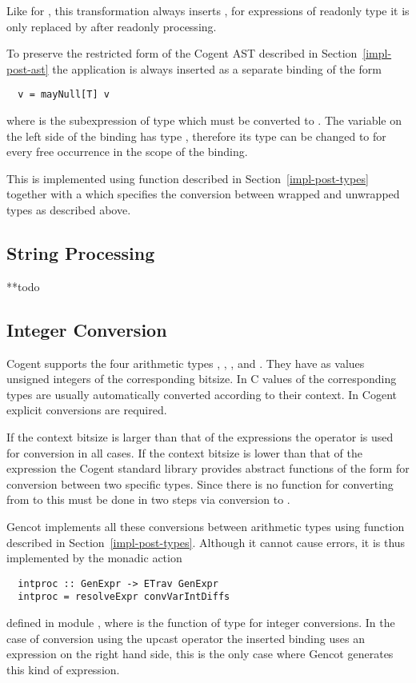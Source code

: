 Like for , this transformation always inserts , for expressions of readonly type it is only replaced by
 after readonly processing.

To preserve the restricted form of the Cogent AST described in Section~\ref{impl-post-ast} the  application is always
inserted as a separate binding of the form
\begin{verbatim}
  v = mayNull[T] v
\end{verbatim}
where  is the subexpression of type  which must be converted to . The variable  on the left side
of the binding has type , therefore its type can be changed to  for every free occurrence in the scope
of the binding.

This is implemented using function  described in Section~\ref{impl-post-types} together with a 
which specifies the conversion between  wrapped and unwrapped types as described above.

\subsection{String Processing}
\label{impl-post-string}

**todo 

\subsection{Integer Conversion}
\label{impl-post-int}

Cogent supports the four arithmetic types , , , and . They have as values unsigned
integers of the corresponding bitsize. In C values of the corresponding types are usually automatically converted according
to their context. In Cogent explicit conversions are required.

If the context bitsize is larger than that of the expressions the  operator is used for conversion in all cases.
If the context bitsize is lower than that of the expression the Cogent standard library provides abstract functions of the
form  for conversion between two specific types. Since there is no function for converting from 
to  this must be done in two steps via conversion to .

Gencot implements all these conversions between arithmetic types using function  described in
Section~\ref{impl-post-types}. Although it cannot cause errors, it is thus implemented by the monadic action
\begin{verbatim}
  intproc :: GenExpr -> ETrav GenExpr
  intproc = resolveExpr convVarIntDiffs
\end{verbatim}
defined in module , where  is the function of type 
for integer conversions. In the case of conversion using the upcast operator the inserted binding uses an  expression
on the right hand side, this is the only case where Gencot generates this kind of expression.

